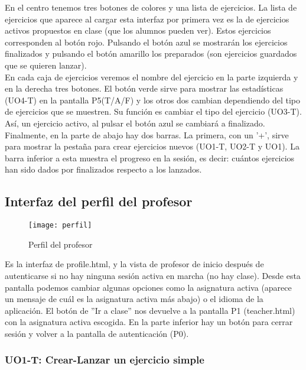 En el centro tenemos tres botones de colores y una lista de ejercicios. La lista de ejercicios que aparece al cargar esta interfaz por primera vez es la de ejercicios activos propuestos en clase (que los alumnos pueden ver). Estos ejercicios corresponden al botón rojo. Pulsando el botón azul se mostrarán los ejercicios finalizados y pulsando el botón amarillo los preparados (son ejercicios guardados que se quieren lanzar).\\

En cada caja de ejercicios veremos el nombre del ejercicio en la parte izquierda y en la derecha tres botones. El botón verde sirve para mostrar las estadísticas (UO4-T) en la pantalla P5(T/A/F) y los otros dos cambian dependiendo del tipo de ejercicios que se muestren. Su función es cambiar el tipo del ejercicio (UO3-T). Así, un ejercicio activo, al pulsar el botón azul se cambiará a finalizado.\\

Finalmente, en la parte de abajo hay dos barras. La primera, con un '+', sirve para mostrar la pestaña para crear ejercicios nuevos (UO1-T, UO2-T y UO1). La barra inferior a esta muestra el progreso en la sesión, es decir: cuántos ejercicios han sido dados por finalizados respecto a los lanzados.\\

\subsection{Interfaz del perfil del profesor}
\label{diseno-e-implementacion:interfaces:perfil}

\begin{figure}[H]
	\centering
	\texttt{[image: perfil]}
	\caption{Perfil del profesor}
	\label{fig:perfil}
\end{figure}

Es la interfaz de profile.html, y la vista de profesor de inicio después de autenticarse si no hay ninguna sesión activa en marcha (no hay clase). Desde esta pantalla podemos cambiar algunas opciones como la asignatura activa (aparece un mensaje de cuál es la asignatura activa más abajo) o el idioma de la aplicación. El botón de ''Ir a clase'' nos devuelve a la pantalla P1 (teacher.html) con la asignatura activa escogida. En la parte inferior hay un botón para cerrar sesión y volver a la pantalla de autenticación (P0).\\

\subsubsection{UO1-T: Crear-Lanzar un ejercicio simple}
\label{diseno-e-implementacion:interfaces:profesor:uo1-t}

